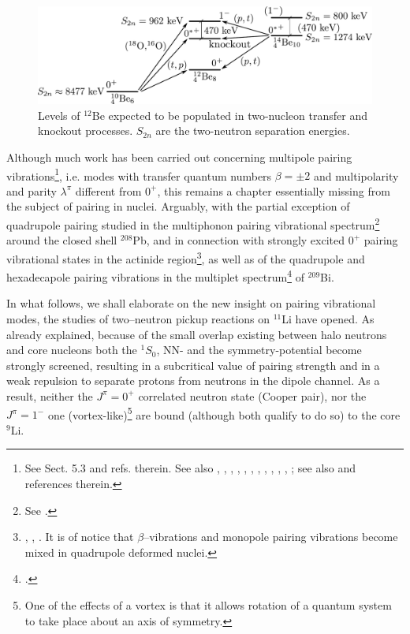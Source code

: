 \begin{subappendices}
\begin{figure}
\includegraphics[width=\textwidth]{C8/figsC8/figa4_newnew.pdf}
\caption{Levels of $^{12}$Be expected to be populated in two-nucleon transfer and knockout processes. $S_{2n}$ are the two-neutron separation energies.}\label{fig6.I.4}
\end{figure}




Although much work has been carried out concerning multipole pairing vibrations\footnote{See \cite{Brink:05} Sect. 5.3 and refs. therein. See also  \cite{Broglia:74}, \cite{Ragnarsson:76}, \cite{Broglia:71b}, \cite{Broglia:71c}, \cite{Bes:71d}, \cite{Bes:71}, \cite{Flynn:71}, \cite{Bes:72}, \cite{Broglia:81c}, \cite{Bohr:74b}, \cite{Flynn:72},  \cite{Bortignon:76}; see also \cite{Kubo:70} and references therein.}, i.e. modes with transfer quantum numbers $\beta=\pm2$ and multipolarity and parity $\lambda^\pi$ different from $0^+$, this remains a chapter essentially missing from the subject of pairing in nuclei. Arguably, with the partial exception of quadrupole pairing studied in the multiphonon pairing vibrational spectrum\footnote{See \cite{Flynn:72}.} around the closed shell $^{208}$Pb, and in connection with strongly excited $0^+$ pairing vibrational states in the actinide region\footnote{\cite{Casten:72}, \cite{Bes:72}, \cite{Ragnarsson:76}. It is of notice that $\beta$--vibrations and monopole pairing vibrations become mixed in quadrupole deformed nuclei.}, as well as of the quadrupole and hexadecapole pairing vibrations in the multiplet spectrum\footnote{\cite{Bortignon:76}.} of $^{209}$Bi.

In what follows, we shall elaborate on the new insight on pairing vibrational modes, the studies of two--neutron pickup reactions on $^{11}$Li have opened. As already explained, because of the small overlap existing between halo neutrons and core nucleons both the $^1S_0$, NN- and the symmetry-potential become strongly screened, resulting in a subcritical value of pairing strength and in a weak repulsion to separate protons from neutrons in the dipole channel.
As a result, neither the $J^{\pi}=0^+$ correlated neutron state  (Cooper pair), nor the $J^\pi=1^-$ one (vortex-like)\footnote{One of the effects of a vortex is that it allows rotation of a quantum system to take place about an axis of symmetry.} are bound 
(although both qualify to do so) to the core $^{9}$Li. 



\end{subappendices}
